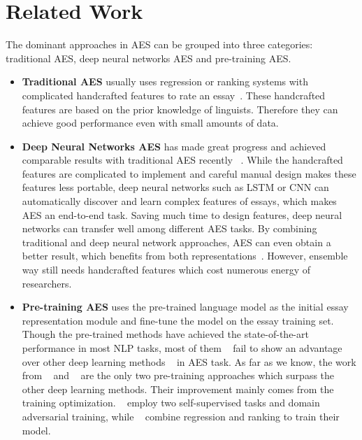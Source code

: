 \documentclass[11pt]{article}
\begin{document}
\section{Related Work}

The dominant approaches in AES can be grouped into three categories: traditional AES, deep neural networks AES and pre-training AES.

\begin{itemize}
\item \textbf{Traditional AES} usually uses regression or ranking systems with complicated handcrafted features to rate an essay~\citep{Larkey:1998,  Rudner:2002, Attali:2006, Yannakoudakis:2011, Chen:2013, Phandi:2015, Cozma:2018}.
These handcrafted features are based on the prior knowledge of linguists.
Therefore they can achieve good performance even with small amounts of data.


\item \textbf{Deep Neural Networks AES} has made great progress and achieved comparable results with traditional AES recently ~\citep{Taghipour:2016, Dong:2016, Dong:2017, Alikaniotis:2016, Wang:2018, Tay:2018, Farag:2018, Song:2020, Ridley:2021,  Muangkammuen:2020, Mathias:2020}.
While the handcrafted features are complicated to implement and careful manual design makes these features less portable, deep neural networks such as LSTM or CNN can automatically discover and learn complex features of essays, which makes AES an end-to-end task.
Saving much time to design features, deep neural networks can transfer well among different AES tasks.
By combining traditional and deep neural network approaches, AES can even obtain a better result, which benefits from both representations~\citep{Jin:2018, Dasgupta:2018, Uto:2020}.
However, ensemble way still needs handcrafted features which cost numerous energy of researchers.

\item \textbf{Pre-training AES} uses the pre-trained language model as the initial essay representation module and fine-tune the model on the essay training set.
Though the pre-trained methods have achieved the state-of-the-art performance in most NLP tasks, most of them ~\citep{Uto:2020, Rodriguez:2019, Mayfield:2020} fail to show an advantage over other deep learning methods ~\citep{Dong:2017, Tay:2018} in AES task. As far as we know, the work from ~\citet{Cao:2020} and ~\citet{Yang:2020} are the only two pre-training approaches which surpass the other deep learning methods. Their improvement mainly comes from the training optimization. ~\citet{Cao:2020} employ two self-supervised tasks and domain adversarial training, while ~\citet{Yang:2020} combine regression and ranking to train their model.

\end{itemize}
\end{document}
